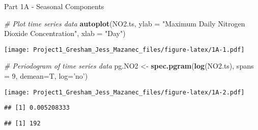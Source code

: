\documentclass[
]{article}
\newenvironment{Shaded}{\begin{snugshade}}{\end{snugshade}}
\newcommand{\CommentTok}[1]{\textcolor[rgb]{0.56,0.35,0.01}{\textit{#1}}}
\newcommand{\DataTypeTok}[1]{\textcolor[rgb]{0.13,0.29,0.53}{#1}}
\newcommand{\DecValTok}[1]{\textcolor[rgb]{0.00,0.00,0.81}{#1}}
\newcommand{\KeywordTok}[1]{\textcolor[rgb]{0.13,0.29,0.53}{\textbf{#1}}}
\newcommand{\NormalTok}[1]{#1}
\newcommand{\OperatorTok}[1]{\textcolor[rgb]{0.81,0.36,0.00}{\textbf{#1}}}
\newcommand{\StringTok}[1]{\textcolor[rgb]{0.31,0.60,0.02}{#1}}
\begin{document}
Part 1A - Seasonal Components

\begin{Shaded}
\begin{Highlighting}[]
\CommentTok{# Plot time series data}
\KeywordTok{autoplot}\NormalTok{(NO2.ts, }\DataTypeTok{ylab =} \StringTok{"Maximum Daily Nitrogen Dioxide Concentration"}\NormalTok{, }\DataTypeTok{xlab =} \StringTok{"Day"}\NormalTok{)}
\end{Highlighting}
\end{Shaded}

\texttt{[image: Project1\_Gresham\_Jess\_Mazanec\_files/figure-latex/1A-1.pdf]}

\begin{Shaded}
\begin{Highlighting}[]
\CommentTok{# Periodogram of time series data}
\NormalTok{pg.NO2 <-}\StringTok{ }\KeywordTok{spec.pgram}\NormalTok{(}\KeywordTok{log}\NormalTok{(NO2.ts), }\DataTypeTok{spans =} \DecValTok{9}\NormalTok{, }\DataTypeTok{demean=}\NormalTok{T, }\DataTypeTok{log=}\StringTok{'no'}\NormalTok{)}
\end{Highlighting}
\end{Shaded}

\texttt{[image: Project1\_Gresham\_Jess\_Mazanec\_files/figure-latex/1A-2.pdf]}

\begin{Shaded}
\end{Shaded}

\begin{verbatim}
## [1] 0.005208333
\end{verbatim}

\begin{Shaded}
\end{Shaded}

\begin{verbatim}
## [1] 192
\end{verbatim}
\end{document}

